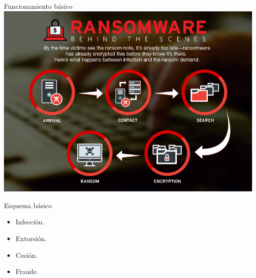 \documentclass[10pt]{beamer}
\begin{document}
\begin{frame}[fragile]{Funcionamiento básico}
	\centering
	\includegraphics[scale=0.25]{./Imagenes/ransomware2.jpg}
	\pause
	\begin{block}{Esquema básico}
		\begin{itemize}
			\pause
			\item Infección.
			\pause
			\item Extorsión.
			\pause
			\item Cesión.
			\pause
			\item Fraude.
		\end{itemize}
	\end{block}
\end{frame}
\end{document}
